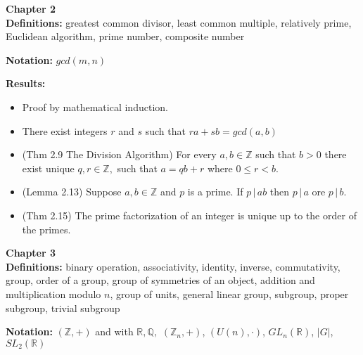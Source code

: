 \documentclass[12pt]{article}
\newcommand{\bbZ}{\mathbb{Z}}
\newcommand{\bbR}{\mathbb{R}}
\newcommand{\bbQ}{\mathbb{Q}}
\newcommand{\divs}{\, \big | \,}
\begin{document}
\noindent \textbf{Chapter 2}\\

\textbf{Definitions:} greatest common divisor, least common multiple, relatively prime, Euclidean algorithm, prime number, composite number

\textbf{Notation:} $gcd(m,n)$

\textbf{Results:}
\begin{itemize}
	\item Proof by mathematical induction.
	\item There exist integers $r$ and $s$ such that $ra+sb=gcd(a,b)$
	\item (Thm 2.9 The Division Algorithm) For every $a,b \in \bbZ$ such that $b >0$ there exist unique $q,r \in \bbZ,$ such that $a=qb+r$ where $0 \leq r <b.$
	\item (Lemma 2.13) Suppose $a,b \in \bbZ$ and $p$ is a prime. If $p \divs ab$ then $p \divs a$ ore $p \divs b.$
	\item (Thm 2.15) The prime factorization of an integer is unique up to the order of the primes.
\end{itemize}

\noindent \textbf{Chapter 3}\\

\textbf{Definitions:} binary operation, associativity, identity, inverse, commutativity, group, order of a group, group of symmetries of an object, addition and multiplication modulo $n$, group of units, general linear group, subgroup, proper subgroup, trivial subgroup

\textbf{Notation:} $(\bbZ,+)$ and with $\bbR,\bbQ,$  $(\bbZ_n,+)$, $(U(n), \cdot )$, $GL_n(\bbR)$, $|G|$, $SL_2(\bbR)$
\end{document}
